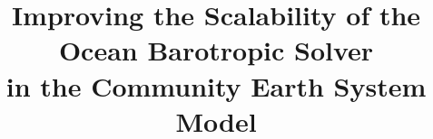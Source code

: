 \documentclass{sig-alternate}
\begin{document}
%


\title{Improving the Scalability of the Ocean Barotropic Solver \\in the Community Earth System Model}
%
%
%
%
%

%
\end{document}
